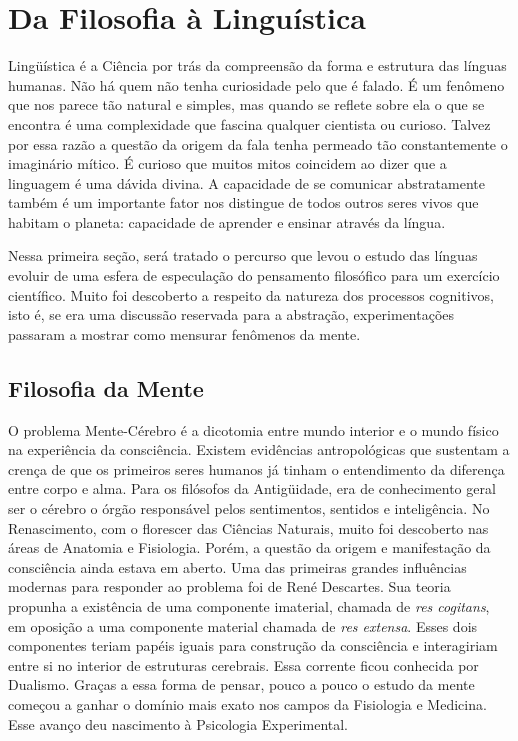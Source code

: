
\section{Da Filosofia à Linguística}

Lingüística é a Ciência por trás da compreensão da forma e estrutura das línguas humanas. Não há quem não tenha curiosidade 
pelo que é falado. É um fenômeno que nos parece tão natural e simples, mas quando se reflete sobre ela o que se encontra é uma complexidade que fascina qualquer cientista ou curioso. Talvez por essa razão a questão da origem da fala tenha permeado tão constantemente o imaginário mítico. É curioso que muitos mitos coincidem ao dizer que a linguagem é uma dávida divina. A capacidade de se comunicar abstratamente também é um importante fator nos distingue de todos outros seres vivos que habitam o planeta: capacidade de aprender e ensinar através da língua. 

Nessa primeira seção, será tratado o percurso que levou o estudo das línguas evoluir de uma esfera de especulação do pensamento filosófico para um exercício científico. Muito foi descoberto a respeito da natureza dos processos cognitivos, isto é, se era uma discussão reservada para a abstração, experimentações passaram a mostrar como mensurar fenômenos da mente.

\subsection{Filosofia da Mente}

O problema Mente-Cérebro é a dicotomia entre mundo interior e o mundo físico na experiência da consciência. Existem evidências antropológicas que sustentam a crença de que os primeiros seres humanos já tinham o entendimento da diferença entre corpo e alma. Para os filósofos da Antigüidade, era de conhecimento geral ser o cérebro o órgão responsável pelos sentimentos, sentidos e inteligência. No Renascimento, com o florescer das Ciências Naturais, muito foi descoberto nas áreas de Anatomia e Fisiologia. Porém, a questão da origem e manifestação da consciência ainda estava em aberto. 
Uma das primeiras grandes influências modernas para responder ao problema foi de René Descartes. Sua teoria propunha a existência de uma componente imaterial, chamada de \emph{res cogitans}, em oposição a uma componente material chamada de \emph{res extensa}. Esses dois componentes teriam papéis iguais para construção da consciência e interagiriam entre si no interior de estruturas cerebrais. Essa corrente ficou conhecida por Dualismo. Graças a essa forma de pensar, pouco a pouco o estudo da mente começou a ganhar o domínio mais exato nos campos da Fisiologia e Medicina. Esse avanço deu nascimento à Psicologia Experimental.

